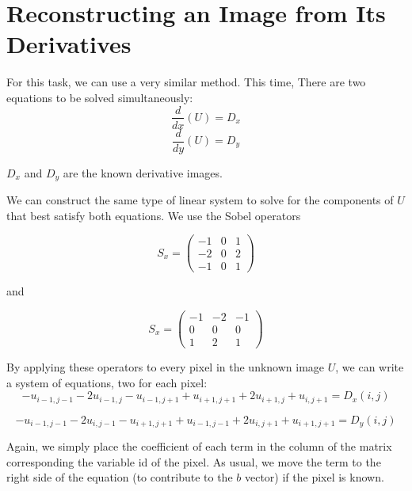 \documentclass{InsightArticle}
\begin{document}
\section{Reconstructing an Image from Its Derivatives}
For this task, we can use a very similar method. This time, There are two equations to be solved simultaneously:
\begin{equation}
\frac{d}{dx}(U) = D_x
\end{equation}
\begin{equation}
\frac{d}{dy}(U) = D_y
\end{equation}

$D_x$ and $D_y$ are the known derivative images.

We can construct the same type of linear system to solve for the components of $U$ that best satisfy both equations. We use the Sobel operators

\begin{equation}
S_x =
\begin{pmatrix}
-1 & 0 & 1 \\
-2 & 0 & 2\\
-1 & 0 & 1
\end{pmatrix}
\end{equation}

and

\begin{equation}
S_x =
\begin{pmatrix}
-1 & -2 & -1 \\
0 & 0 & 0\\
1 & 2 & 1
\end{pmatrix}
\end{equation}

By applying these operators to every pixel in the unknown image $U$, we can write a system of equations, two for each pixel:
\begin{equation}
- u_{i-1,j-1} -2 u_{i-1,j} - u_{i-1,j+1} + u_{i+1,j+1} + 2 u_{i+1,j} + u_{i,j+1} = D_x(i,j)
\end{equation}

\begin{equation}
- u_{i-1,j-1} -2 u_{i,j-1} - u_{i+1,j+1} + u_{i-1,j-1} + 2 u_{i,j+1} + u_{i+1,j+1} = D_y(i,j)
\end{equation}

Again, we simply place the coefficient of each term in the column of the matrix corresponding the variable id of the pixel. As usual, we move the term to the right side of the equation (to contribute to the $b$ vector) if the pixel is known.
\end{document}
